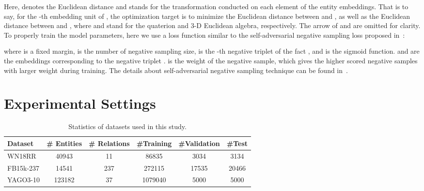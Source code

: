 \documentclass[11pt]{article}
\begin{document}
\noindent Here,  denotes the Euclidean distance and  stands for the transformation conducted on each element of the entity embeddings. That is to say, for the -th embedding unit of , the optimization target is to minimize the Euclidean distance between  and , as well as the Euclidean distance between  and ,
\noindent where   and  stand for the quaterion and 3-D Euclidean algebra, respectively. The arrow of  and  are omitted for clarity.
To properly train the model parameters, here we use a loss function similar to the self-adversarial negative
sampling loss proposed in~\cite{sun2019rotate}:

where  is a fixed margin,  is the number of negative sampling size,   is the -th negative triplet of the fact , and  is the sigmoid function. 
 and are the embeddings corresponding to the negative triplet .
 is the weight of the negative sample, which gives the higher scored negative samples with larger weight during training. The details about self-adversarial negative sampling technique can be found in~\cite{sun2019rotate}.

\section{Experimental Settings}

\begin{table*}[]
\centering
\caption{Statistics of datasets used in this study.}

\begin{tabular}{ l c c c c c  }
 \toprule
 Dataset  & \# Entities & \# Relations & \#{Training}  &  \#{Validation}   & \#{Test}  \\  
 \midrule
WN18RR & 40943   & 11  & 86835  & 3034  & 3134   \\
 FB15k-237 & 14541   & 237  & 272115   & 17535   & 20466\\ YAGO3-10    & 123182    & 37  & 1079040   & 5000   & 5000 \\ 
\bottomrule
\end{tabular} 
\label{Stat}
\end{table*}
\end{document}
